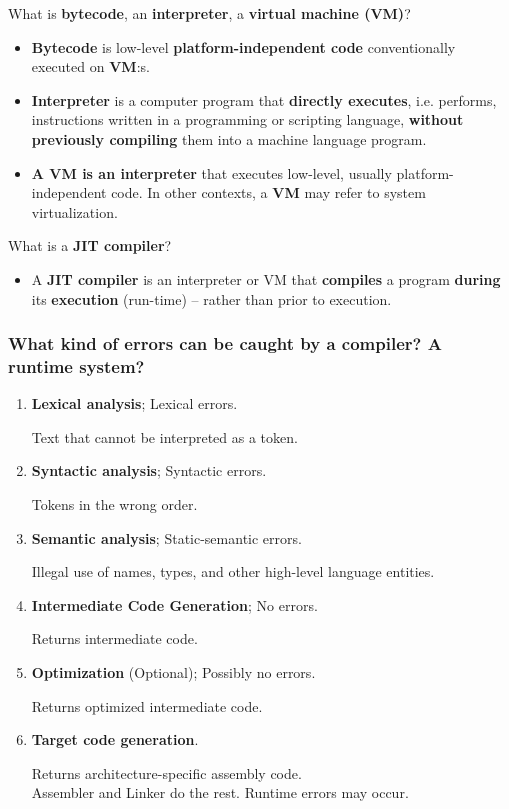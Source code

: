 \documentclass[11pt]{beamer}
\begin{document}
\begin{frame}

\begin{block}{What is \textbf{bytecode}, an \textbf{interpreter}, a \textbf{virtual machine (VM)}?}
\begin{itemize}
\item \textbf{Bytecode} is low-level \textbf{platform-independent code} conventionally executed on \textbf{VM}:s.
\item \textbf{Interpreter} is a computer program that \textbf{directly executes}, i.e. performs, instructions written in a programming or scripting language, \textbf{without previously compiling} them into a machine language program.
\item \textbf{A VM is an interpreter} that executes low-level, usually platform-independent code. In other contexts, a \textbf{VM} may refer to system virtualization. 
\end{itemize}
\end{block}

\begin{block}{What is a \textbf{JIT compiler}?}
\begin{itemize}
\item A \textbf{JIT compiler} is an interpreter or VM that \textbf{compiles} a program \textbf{during} its \textbf{execution} (run-time) – rather than prior to execution.
\end{itemize}
\end{block}


\end{frame}

\begin{frame}
\frametitle{What kind of errors can be caught by a compiler? A runtime system?}



\begin{enumerate}
\item \textbf{Lexical analysis}; Lexical errors.

Text that cannot be interpreted as a token.
\item \textbf{Syntactic analysis}; Syntactic errors.

Tokens in the wrong order.
\item \textbf{Semantic analysis}; Static-semantic errors.

Illegal use of names, types, and other high-level language entities.
\item \textbf{Intermediate Code Generation}; No errors.

Returns intermediate code.
\item \textbf{Optimization} (Optional); Possibly no errors.

Returns optimized intermediate code.
\item \textbf{Target code generation}.

Returns architecture-specific assembly code. \\Assembler and Linker do the rest. Runtime errors may occur.
\end{enumerate}

\end{frame}
\end{document}
